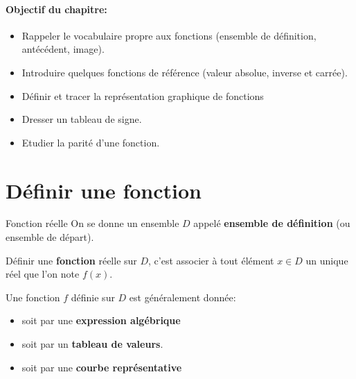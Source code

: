 \documentclass[10pt,a4paper,openany,twoside,prof]{book}
\begin{document}
\entetegal{}

\vspace{-7mm}
\paragraph*{Objectif du chapitre:}
\begin{itemize}
    \vspace{-2mm}
    \setlength\itemsep{-1mm}
    \item Rappeler le vocabulaire propre aux fonctions (ensemble de définition, antécédent, image).
    \item Introduire quelques fonctions de référence (valeur absolue, inverse et carrée).
    \item Définir et tracer la représentation graphique de fonctions
    \item Dresser un tableau de signe.
    \item Etudier la parité d'une fonction.
\end{itemize}
\vspace{-7mm}


\section{Définir une fonction}

\begin{defi}{Fonction réelle}{}
    On se donne un ensemble $D$ appelé \textbf{ensemble de définition} (ou ensemble de départ).

    Définir une \textbf{fonction} réelle sur $D$, c'est associer à tout élément $x\in D$ un unique réel que l'on note $f(x)$.

    Une fonction $f$ définie sur $D$ est généralement donnée:
    \begin{itemize}
        \item soit par une \textbf{expression algébrique}
        \item soit par un \textbf{tableau de valeurs}.
        \item soit par une \textbf{courbe représentative}
    \end{itemize}
\end{defi}
\end{document}

